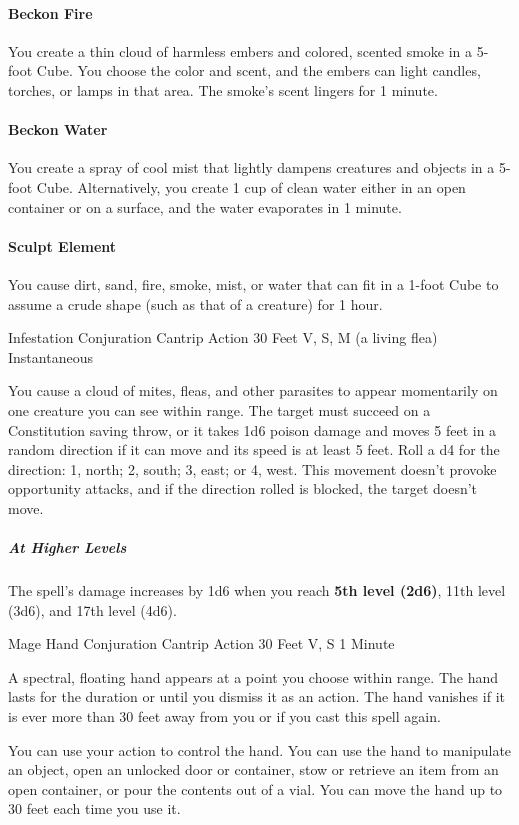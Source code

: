 \documentclass[letterpaper,openany,oneside,twocolumn]{book}
\begin{document}
\paragraph*{Beckon Fire} You create a thin cloud of harmless embers and colored, scented smoke in a 5-foot Cube. You choose the color and scent, and the embers can light candles, torches, or lamps in that area. The smoke's scent lingers for 1 minute.
\paragraph*{Beckon Water} You create a spray of cool mist that lightly dampens creatures and objects in a 5-foot Cube. Alternatively, you create 1 cup of clean water either in an open container or on a surface, and the water evaporates in 1 minute.
\paragraph*{Sculpt Element} You cause dirt, sand, fire, smoke, mist, or water that can fit in a 1-foot Cube to assume a crude shape (such as that of a creature) for 1 hour.

\DndSpellHeader
  {Infestation}
  {Conjuration Cantrip}
  {Action}
  {30 Feet}
  {V, S, M (a living flea)}
  {Instantaneous}

You cause a cloud of mites, fleas, and other parasites to appear momentarily on one creature you can see within range. The target must succeed on a Constitution saving throw, or it takes 1d6 poison damage and moves 5 feet in a random direction if it can move and its speed is at least 5 feet. Roll a d4 for the direction: 1, north; 2, south; 3, east; or 4, west. This movement doesn't provoke opportunity attacks, and if the direction rolled is blocked, the target doesn't move.

\subparagraph*{At Higher Levels} The spell's damage increases by 1d6 when you reach \textbf{5th level (2d6)}, 11th level (3d6), and 17th level (4d6).

\DndSpellHeader
  {Mage Hand}
  {Conjuration Cantrip}
  {Action}
  {30 Feet}
  {V, S}
  {1 Minute}

A spectral, floating hand appears at a point you choose within range. The hand lasts for the duration or until you dismiss it as an action. The hand vanishes if it is ever more than 30 feet away from you or if you cast this spell again.

You can use your action to control the hand. You can use the hand to manipulate an object, open an unlocked door or container, stow or retrieve an item from an open container, or pour the contents out of a vial. You can move the hand up to 30 feet each time you use it.
\end{document}
